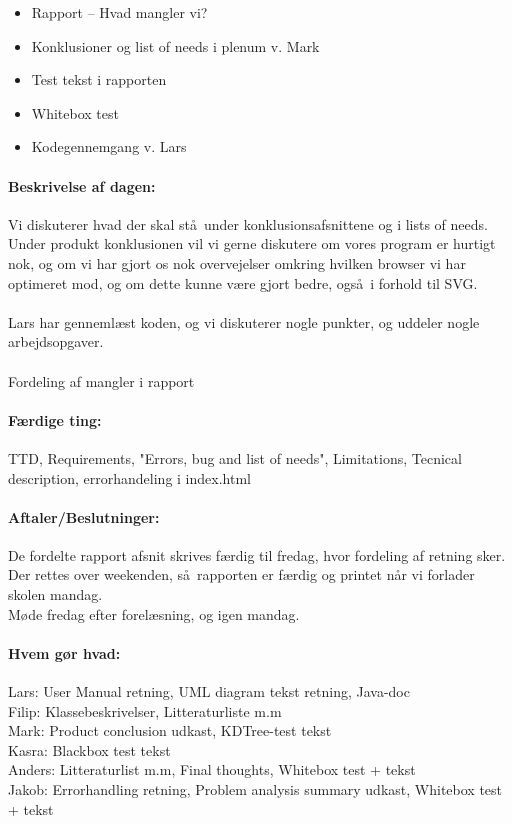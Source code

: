 \documentclass[a4paper,10pt,titlepage]{article}
\begin{document}
		\begin{itemize}
					\item Rapport – Hvad mangler vi?
					\item Konklusioner og list of needs i plenum v. Mark
					\item Test tekst i rapporten
					\item Whitebox test
					\item Kodegennemgang v. Lars
		\end{itemize}
		
		\paragraph{Beskrivelse af dagen:}
		Vi diskuterer hvad der skal st\aa \ under konklusionsafsnittene og i lists of needs.
		Under produkt konklusionen vil vi gerne diskutere om vores program er hurtigt nok,
		og om vi har gjort os nok overvejelser omkring hvilken browser vi har optimeret mod,
		og om dette kunne v\ae re gjort bedre, ogs\aa \ i forhold til SVG.\\
		\\

		Lars har genneml\ae st koden, og vi diskuterer nogle punkter, og uddeler nogle arbejdsopgaver.\\
		\\
		
		Fordeling af mangler i rapport\\

		\paragraph{F\ae rdige ting:}
		TTD, Requirements, "Errors, bug and list of needs", Limitations, 
		Tecnical description, errorhandeling i index.html\\
		
		\paragraph{Aftaler/Beslutninger:}
		De fordelte rapport afsnit skrives f\ae rdig til fredag, hvor fordeling af retning sker.\\
		Der rettes over weekenden, s\aa \ rapporten er f\ae rdig og printet n\aa r vi forlader skolen mandag.\\
		M\o de fredag efter forel\ae sning, og igen mandag.\\
		
		\paragraph{Hvem g\o r hvad:}
		Lars: User Manual retning, UML diagram tekst retning, Java-doc\\
		Filip: Klassebeskrivelser, Litteraturliste m.m\\
		Mark: Product conclusion udkast, KDTree-test tekst\\
		Kasra: Blackbox test tekst\\
		Anders: Litteraturlist m.m, Final thoughts, Whitebox test + tekst\\
		Jakob: Errorhandling retning, Problem analysis summary udkast, Whitebox test + tekst\\
		
\end{document}
